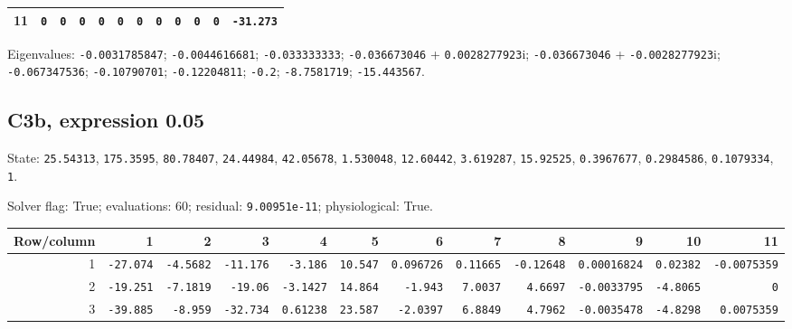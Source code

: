 \begin{landscape}
\begin{tabular}{rrrrrrrrrrrr}
11 & \texttt{0} & \texttt{0} & \texttt{0} & \texttt{0} & \texttt{0} & \texttt{0} & \texttt{0} & \texttt{0} & \texttt{0} & \texttt{0} & \texttt{-31.273} \\

\bottomrule\end{tabular}\par\endgroup

{\scriptsize Eigenvalues: \texttt{-0.0031785847}; \texttt{-0.0044616681}; \texttt{-0.033333333}; \texttt{-0.036673046} + \texttt{0.0028277923}$\mathrm i$; \texttt{-0.036673046} + \texttt{-0.0028277923}$\mathrm i$; \texttt{-0.067347536}; \texttt{-0.10790701}; \texttt{-0.12204811}; \texttt{-0.2}; \texttt{-8.7581719}; \texttt{-15.443567}.\par}

\clearpage
\subsection*{C3b, expression 0.05}
{\scriptsize State: \texttt{25.54313}, \texttt{175.3595}, \texttt{80.78407}, \texttt{24.44984}, \texttt{42.05678}, \texttt{1.530048}, \texttt{12.60442}, \texttt{3.619287}, \texttt{15.92525}, \texttt{0.3967677}, \texttt{0.2984586}, \texttt{0.1079334}, \texttt{1}.\par

Solver flag: True; evaluations: 60; residual: \texttt{9.00951e-11}; physiological: True.\par}

\begingroup\scriptsize\setlength{\tabcolsep}{3pt}\centering
\begin{tabular}{rrrrrrrrrrrr}\toprule

Row/column & 1 & 2 & 3 & 4 & 5 & 6 & 7 & 8 & 9 & 10 & 11 \\ \midrule

1 & \texttt{-27.074} & \texttt{-4.5682} & \texttt{-11.176} & \texttt{-3.186} & \texttt{10.547} & \texttt{0.096726} & \texttt{0.11665} & \texttt{-0.12648} & \texttt{0.00016824} & \texttt{0.02382} & \texttt{-0.0075359} \\

2 & \texttt{-19.251} & \texttt{-7.1819} & \texttt{-19.06} & \texttt{-3.1427} & \texttt{14.864} & \texttt{-1.943} & \texttt{7.0037} & \texttt{4.6697} & \texttt{-0.0033795} & \texttt{-4.8065} & \texttt{0} \\

3 & \texttt{-39.885} & \texttt{-8.959} & \texttt{-32.734} & \texttt{0.61238} & \texttt{23.587} & \texttt{-2.0397} & \texttt{6.8849} & \texttt{4.7962} & \texttt{-0.0035478} & \texttt{-4.8298} & \texttt{0.0075359} \\


\end{tabular}
\end{landscape}
